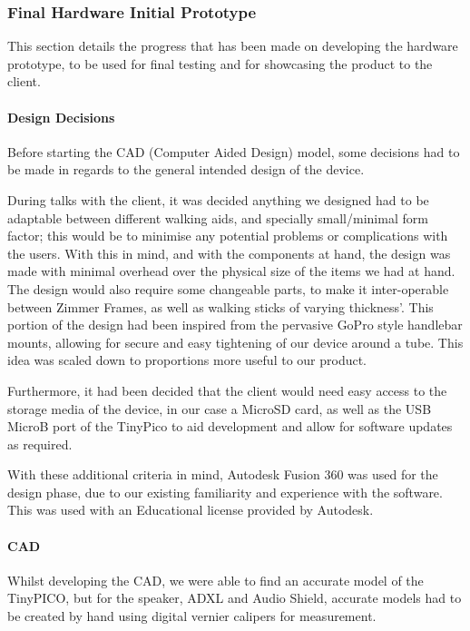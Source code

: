{\subsubsection{Final Hardware Initial Prototype}

This section details the progress that has been made on developing the hardware prototype, to be used for final testing and for showcasing the product to the client.

\paragraph{Design Decisions}

Before starting the CAD (Computer Aided Design) model, some decisions had to be made in regards to the general intended design of the device.

During talks with the client, it was decided anything we designed had to be adaptable between different walking aids, and specially small/minimal form factor; this would be to minimise any potential problems or complications with the users. With this in mind, and with the components at hand, the design was made with minimal overhead over the physical size of the items we had at hand. The design would also require some changeable parts, to make it inter-operable between Zimmer Frames, as well as walking sticks of varying thickness'. This portion of the design had been inspired from the pervasive GoPro style handlebar mounts, allowing for secure and easy tightening of our device around a tube. This idea was scaled down to proportions more useful to our product.

Furthermore, it had been decided that the client would need easy access to the storage media of the device, in our case a MicroSD card, as well as the USB MicroB port of the TinyPico to aid development and allow for software updates as required.

With these additional criteria in mind, Autodesk Fusion 360 was used for the design phase, due to our existing  familiarity and experience with the software. This was used with an Educational license provided by Autodesk.

\paragraph{CAD}

Whilst developing the CAD, we were able to find an accurate model of the TinyPICO, but for the speaker, ADXL and Audio Shield, accurate models had to be created by hand using digital vernier calipers for measurement. 

}
